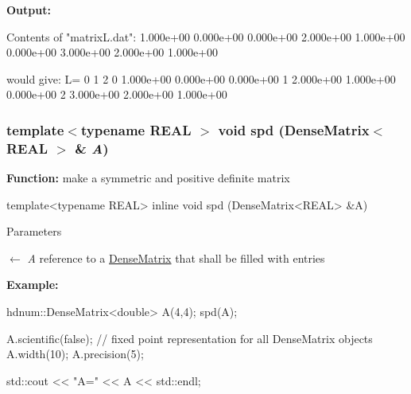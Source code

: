 {\bfseries Output:} \begin{DoxyVerb}
Contents of "matrixL.dat":
1.000e+00  0.000e+00  0.000e+00	 
2.000e+00  1.000e+00  0.000e+00	 
3.000e+00  2.000e+00  1.000e+00	 

would give:
L=
                      0          1          2
          0   1.000e+00  0.000e+00  0.000e+00
          1   2.000e+00  1.000e+00  0.000e+00
          2   3.000e+00  2.000e+00  1.000e+00
	\end{DoxyVerb}
 \hypertarget{classhdnum_1_1DenseMatrix_a2a328e8b5dca944a17fce76e1a51c7ae}{
\subsubsection[{spd}]{\setlength{\rightskip}{0pt plus 5cm}template$<$typename REAL $>$ void spd ({\bf DenseMatrix}$<$ REAL $>$ \& {\em A})}}
\label{classhdnum_1_1DenseMatrix_a2a328e8b5dca944a17fce76e1a51c7ae}
\par
 {\bfseries Function:} make a symmetric and positive definite matrix 
\begin{DoxyCode}
  template<typename REAL>
  inline void spd (DenseMatrix<REAL> &A)
\end{DoxyCode}



\begin{DoxyParams}{Parameters}
\item[\mbox{$\leftarrow$} {\em A}]reference to a \hyperlink{classhdnum_1_1DenseMatrix}{DenseMatrix} that shall be filled with entries\end{DoxyParams}
{\bfseries Example:} 
\begin{DoxyCode}
  hdnum::DenseMatrix<double> A(4,4);
  spd(A);

  A.scientific(false); // fixed point representation for all DenseMatrix objects
  A.width(10);
  A.precision(5);

  std::cout << "A=" << A << std::endl;
\end{DoxyCode}


